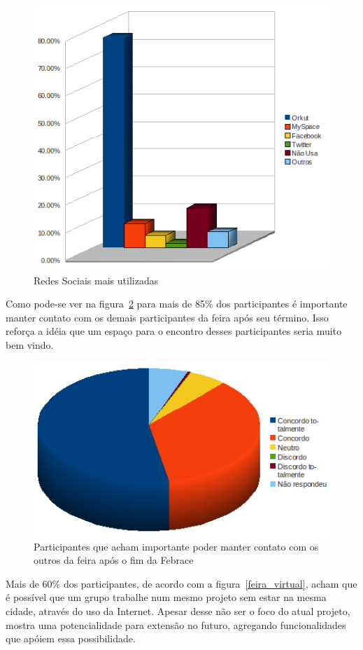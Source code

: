   \begin{figure}
      \begin{center}
	\includegraphics[width=0.7\linewidth]{arquivos/rede_social.png}
      \end{center}
      \caption{Redes Sociais mais utilizadas}
      \label{rede_social}
  \end{figure}

  Como pode-se ver na figura~\ref{contato} para mais de 85\% dos participantes é importante manter contato com os demais participantes da feira após 
seu término. Isso reforça a idéia que um espaço para o encontro desses participantes seria muito bem vindo.

  \begin{figure}
      \begin{center}
	\includegraphics[width=0.7\linewidth]{arquivos/contato.png}
      \end{center}
      \caption{Participantes que acham importante poder manter contato com os outros da feira após o fim da Febrace}
      \label{contato}
  \end{figure}

  Mais de 60\% dos participantes, de acordo com a figura~\ref{feira_virtual}, acham que é possível que um grupo trabalhe num mesmo projeto sem 
estar na mesma cidade, através do uso da Internet. Apesar desse não ser o foco do atual projeto, mostra uma potencialidade para extensão no futuro, 
agregando funcionalidades que apóiem essa possibilidade.

